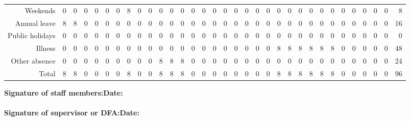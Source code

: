 \documentclass[landscape]{article}\usepackage[]{graphicx}\usepackage[]{color}
\begin{document}
\begin{table}[ht]
\centering
\begin{tabular}{rrrrrrrrrrrrrrrrrrrrrrrrrrrrrrrrr}
   \hline
Weekends & 0 & 0 & 0 & 0 & 0 & 0 & 8 & 0 & 0 & 0 & 0 & 0 & 0 & 0 & 0 & 0 & 0 & 0 & 0 & 0 & 0 & 0 & 0 & 0 & 0 & 0 & 0 & 0 & 0 & 0 & 0 & 8 \\ 
  Annual leave & 8 & 8 & 0 & 0 & 0 & 0 & 0 & 0 & 0 & 0 & 0 & 0 & 0 & 0 & 0 & 0 & 0 & 0 & 0 & 0 & 0 & 0 & 0 & 0 & 0 & 0 & 0 & 0 & 0 & 0 & 0 & 16 \\ 
  Public holidays & 0 & 0 & 0 & 0 & 0 & 0 & 0 & 0 & 0 & 0 & 0 & 0 & 0 & 0 & 0 & 0 & 0 & 0 & 0 & 0 & 0 & 0 & 0 & 0 & 0 & 0 & 0 & 0 & 0 & 0 & 0 & 0 \\ 
  Illness & 0 & 0 & 0 & 0 & 0 & 0 & 0 & 0 & 0 & 0 & 0 & 0 & 0 & 0 & 0 & 0 & 0 & 0 & 0 & 0 & 8 & 8 & 8 & 8 & 8 & 8 & 0 & 0 & 0 & 0 & 0 & 48 \\ 
  Other absence & 0 & 0 & 0 & 0 & 0 & 0 & 0 & 0 & 0 & 8 & 8 & 8 & 0 & 0 & 0 & 0 & 0 & 0 & 0 & 0 & 0 & 0 & 0 & 0 & 0 & 0 & 0 & 0 & 0 & 0 & 0 & 24 \\ 
  Total & 8 & 8 & 0 & 0 & 0 & 0 & 8 & 0 & 0 & 8 & 8 & 8 & 0 & 0 & 0 & 0 & 0 & 0 & 0 & 0 & 8 & 8 & 8 & 8 & 8 & 8 & 0 & 0 & 0 & 0 & 0 & 96 \\ 
   \hline
\end{tabular}
\end{table}


\textbf{Signature of staff members:}\hspace*{7cm}\textbf{Date:}\\\\
\textbf{Signature of supervisor or DFA:}\hspace*{6.25cm}\textbf{Date:}
\end{document}

